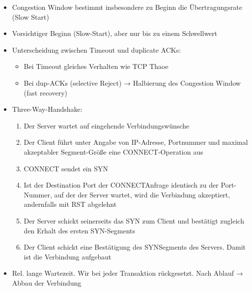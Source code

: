 \begin{itemize}
    \item Congestion Window bestimmt insbesondere zu Beginn die Übertragungsrate (Slow Start)
\end{itemize}

\begin{itemize}
    \item Vorsichtiger Beginn (Slow-Start), aber nur bis zu einem Schwellwert
    \item Unterscheidung zwischen Timeout und duplicate ACKs:
    \begin{itemize}
        \item Bei Timeout gleiches Verhalten wie TCP Thaoe
        \item Bei dup-ACKs (selective Reject) → Halbierung des Congestion Window (fast recovery)
    \end{itemize}
\end{itemize}

\begin{itemize}
    \item Three-Way-Handshake:
    \begin{enumerate}
        \item Der Server wartet auf eingehende Verbindungswünsche
        \item Der Client führt unter Angabe von IP-Adresse, Portnummer und maximal akzeptabler Segment-Größe eine CONNECT-Operation aus
        \item CONNECT sendet ein SYN
        \item Ist der Destination Port der CONNECTAnfrage identisch zu der Port-Nummer, auf der der Server wartet, wird die Verbindung akzeptiert, andernfalls mit RST abgelehnt
        \item Der Server schickt seinerseits das SYN zum Client und bestätigt zugleich den Erhalt des ersten SYN-Segments
        \item Der Client schickt eine Bestätigung des SYNSegments des Servers. Damit ist die Verbindung aufgebaut
    \end{enumerate}
\end{itemize}

\begin{itemize}
    \item Rel. lange Wartezeit. Wir bei jeder Transaktion rückgesetzt. Nach Ablauf → Abbau der Verbindung
\end{itemize}

